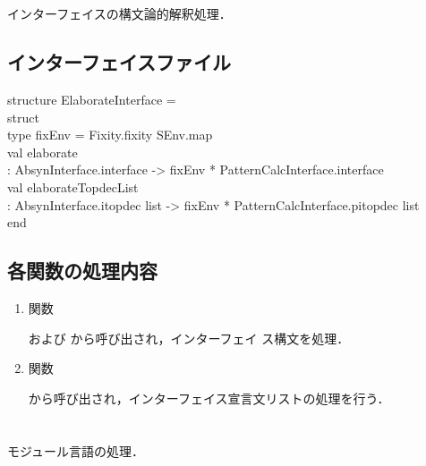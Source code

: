\section{}
\ifjp%
	インターフェイスの構文論的解釈処理．

\subsection{インターフェイスファイル}
\begin{program}
structure ElaborateInterface =\\
\myem   struct\\
\myem\myem     type fixEnv = Fixity.fixity SEnv.map\\
\myem\myem     val elaborate\\
\myem\myem\myem   : AbsynInterface.interface -> fixEnv * PatternCalcInterface.interface\\
\myem\myem     val elaborateTopdecList\\
\myem\myem\myem   : AbsynInterface.itopdec list -> fixEnv * PatternCalcInterface.pitopdec list\\
\myem  end
\end{program}

\subsection{各関数の処理内容}
\begin{enumerate}
\item {}関数

	および
から呼び出され，インターフェイ
ス構文を処理．

\item {}関数

から呼び出され，インターフェイス宣言文リストの処理を行う．

\end{enumerate}
\else%
\fi%

\section{}
\ifjp%
	モジュール言語の処理．

